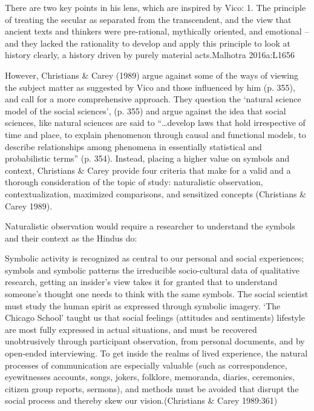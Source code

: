 \begin{myquote}
There are two key points in his lens, which are inspired by Vico: 1. The principle of treating the secular as separated from the transcendent, and the view that ancient texts and thinkers were pre-rational, mythically oriented, and emotional – and they lacked the rationality to develop and apply this principle to look at history clearly, a history driven by purely material acts.\hfill Malhotra 2016a:L1656
\end{myquote}

However, Christians \& Carey (1989) argue against some of the ways of viewing the subject matter as suggested by Vico and those influenced by him (p. 355), and call for a more comprehensive approach. They question the ‘natural science model of the social sciences’, (p. 355) and argue against the idea that social sciences, like natural sciences are said to “…develop laws that hold irrespective of time and place, to explain phenomenon through causal and functional models, to describe relationships among phenomena in essentially statistical and probabilistic terms” (p. 354). Instead, placing a higher value on symbols and context, Christians \& Carey provide four criteria that make for a valid and a thorough consideration of the topic of study: naturalistic observation, contextualization, maximized comparisons, and sensitized concepts (Christians \& Carey 1989).

Naturalistic observation would require a researcher to understand the symbols and their context as the Hindus do:

\begin{myquote}
Symbolic activity is recognized as central to our personal and social experiences; symbols and symbolic patterns the irreducible socio-cultural data of qualitative research, getting an insider’s view takes it for granted that to understand someone’s thought one needs to think with the same symbols. The social scientist must study the human spirit as expressed through symbolic imagery. ‘The Chicago School’ taught us that social feelings (attitudes and sentiments) lifestyle are most fully expressed in actual situations, and must be recovered unobtrusively through participant observation, from personal documents, and by open-ended interviewing. To get inside the realms of lived experience, the natural processes of communication are especially valuable (such as correspondence, eyewitnesses accounts, songs, jokers, folklore, memoranda, diaries, ceremonies, citizen group reports, sermons), and methods must be avoided that disrupt the social process and thereby skew our vision.\hfill (Christians \& Carey 1989:361)
\end{myquote}

